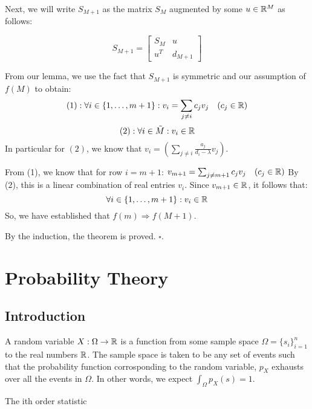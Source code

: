 Next, we will write $S_{M+1}$ as the matrix $S_M$ augmented by some $u \in \mathbb{R}^M$ as follows:

$$ S_{M+1} =
\left[
  \begin{array}{c|c}
  S_M & u\\ 
  \hline
  u^T & d_{M+1} 
\end{array} \right]$$

From our lemma, we use the fact that $S_{M+1}$ is symmetric and our assumption of $f(M)$ to obtain:
$$(1): \forall i \in \{1,\dots,m+1\}: v_i =  {\sum_{j \neq i} c_j v_j} \quad (c_j \in \mathbb{R})$$
$$(2): \forall i \in \tilde{M} : v_i \in \mathbb{R}$$
In particular for $(2)$, we know that $v_i = \left({\sum_{j \neq i} \frac{a_j}{d_i-\lambda} v_j}\right)$.


From (1), we know that for row $i = m+1$:
$v_{m+1} =  {\sum_{j \neq {m+1}} c_j v_j} \quad (c_j \in \mathbb{R})$
By (2), this is a linear combination of real entries $v_i$. Since $v_{m+1} \in \mathbb{R}$, it follows that:
$$\forall i \in \{1,\dots,m+1\}: v_i \in \mathbb{R}$$
So, we have established that $f(m) \Rightarrow f(M+1)$.

By the induction, the theorem is proved. $\square$.

\newpage

\section{Probability Theory}

\subsection{Introduction}
\begin{definition}
A random variable $X: \Omega \to \mathbb{R}$ is a function from some sample space $\Omega = \{s_i\}_{i=1}^n$ to the real numbers $\mathbb{R}$. The sample space is taken to be any set of events such that the probability function corrosponding to the random variable, $p_X$ exhausts over all the events in $\Omega$. In other words, we expect $\int_\Omega p_X(s) = 1$.
\end{definition}
\begin{definition}
The ith order statistic
\end{definition}

